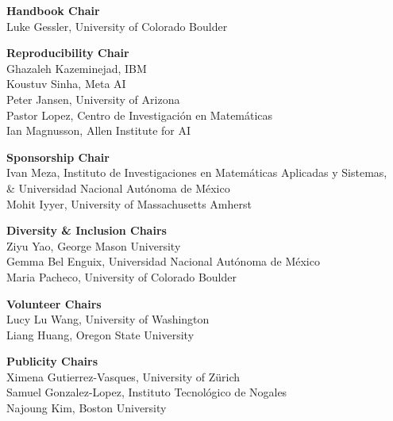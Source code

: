 {\bf Handbook Chair} \\
\hspace*{0.2in} Luke Gessler, University of Colorado Boulder

{\bf Reproducibility Chair} \\
\hspace*{0.2in} Ghazaleh Kazeminejad, IBM \\
\hspace*{0.2in} Koustuv Sinha, Meta AI \\
\hspace*{0.2in} Peter Jansen, University of Arizona \\
\hspace*{0.2in} Pastor Lopez, Centro de Investigaci\'on en Matem\'aticas \\
\hspace*{0.2in} Ian Magnusson, Allen Institute for AI

{\bf Sponsorship Chair} \\
\hspace*{0.2in} Ivan Meza, Instituto de Investigaciones en Matem\'aticas Aplicadas y Sistemas, \\
\hspace*{0.3in} \& Universidad Nacional Aut\'onoma de M\'exico \\
\hspace*{0.2in} Mohit Iyyer, University of Massachusetts Amherst

{\bf Diversity \& Inclusion Chairs} \\
\hspace*{0.2in} Ziyu Yao, George Mason University \\
\hspace*{0.2in} Gemma Bel Enguix, Universidad Nacional Aut\'onoma de M\'exico \\
\hspace*{0.2in} Maria Pacheco, University of Colorado Boulder

{\bf Volunteer Chairs} \\
\hspace*{0.2in} Lucy Lu Wang, University of Washington \\
\hspace*{0.2in} Liang Huang, Oregon State University

{\bf Publicity Chairs} \\
\hspace*{0.2in} Ximena Gutierrez-Vasques, University of Z\"urich \\
\hspace*{0.2in} Samuel Gonzalez-Lopez, Instituto Tecnol\'ogico de Nogales \\
\hspace*{0.2in} Najoung Kim, Boston University

